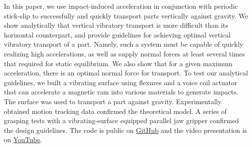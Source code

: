In this paper, we use impact-induced acceleration in conjunction with periodic stick-slip to successfully and quickly transport parts vertically against gravity. We show analytically that vertical vibratory transport is more difficult than its horizontal counterpart, and provide guidelines for achieving optimal vertical vibratory transport of a part. Namely, such a system must be capable of quickly realizing high accelerations, as well as supply normal forces at least several times that required for static equilibrium. We also show that for a given maximum acceleration, there is an optimal normal force for transport. To test our analytical guidelines, we built a vibrating surface using flexures and a voice coil actuator that can accelerate a magnetic ram into various materials to generate impacts. The surface was used to transport a part against gravity. Experimentally obtained motion tracking data confirmed the theoretical model. A series of grasping tests with a vibrating-surface equipped parallel jaw gripper confirmed the design guidelines. The code is public on \href{https://github.com/clyako/vertical-vibratory-transport-of-grasped-parts-using-impacts.git}{\underline{GitHub}} and the video presentation is on \href{https://youtu.be/Mb02fUOyaTE}{\underline{YouTube}}. 